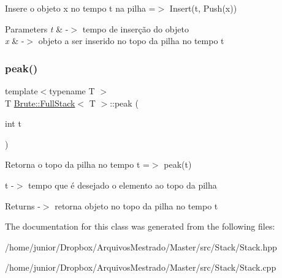 Insere o objeto x no tempo t na pilha =$>$ Insert(t, Push(x))


\begin{DoxyParams}{Parameters}
{\em t} & -\/$>$ tempo de inserção do objeto \\
\hline
{\em x} & -\/$>$ objeto a ser inserido no topo da pilha no tempo t \\
\hline
\end{DoxyParams}
\mbox{\label{classBrute_1_1FullStack_ae6dfa8e6ea0f0d8de2c50afaf9991aaf}} 
\subsubsection{\texorpdfstring{peak()}{peak()}}
{\footnotesize\ttfamily template$<$typename T $>$ \\
T \hyperlink{classBrute_1_1FullStack}{Brute\+::\+Full\+Stack}$<$ T $>$\+::peak (\begin{DoxyParamCaption}\item[{int}]{t }\end{DoxyParamCaption})}

Retorna o topo da pilha no tempo t =$>$ peak(t)

t -\/$>$ tempo que é desejado o elemento ao topo da pilha \begin{DoxyReturn}{Returns}
-\/$>$ retorna objeto no topo da pilha no tempo t 
\end{DoxyReturn}


The documentation for this class was generated from the following files\+:\begin{DoxyCompactItemize}
\item 
/home/junior/\+Dropbox/\+Arquivos\+Mestrado/\+Master/src/\+Stack/Stack.\+hpp\item 
/home/junior/\+Dropbox/\+Arquivos\+Mestrado/\+Master/src/\+Stack/Stack.\+cpp\end{DoxyCompactItemize}
